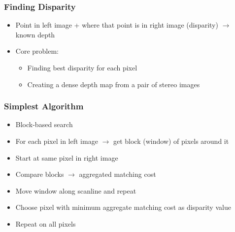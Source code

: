 \documentclass{beamer}
\begin{document}
\begin{frame}
\frametitle{Finding Disparity}
\begin{itemize}
    \item Point in left image + where that point is in right image (disparity) $\rightarrow$ known depth \pause
    \item Core problem:
    \begin{itemize}
        \item Finding best disparity for each pixel \cite{scharstein2002taxonomy}
        \item Creating a dense depth map from a pair of stereo images \cite{scharstein2002taxonomy, zbontar2016stereo}
    \end{itemize}
\end{itemize}
\end{frame}


\begin{frame}
\frametitle{Simplest Algorithm}
\begin{itemize}
    \item Block-based search \cite{scharstein2002taxonomy} \pause
    \item For each pixel in left image $\rightarrow$ get block (window) of pixels around it \pause
    \item Start at same pixel in right image \pause
    \item Compare blocks $\rightarrow$ aggregated matching cost \pause
    \item Move window along scanline and repeat \pause
    \item Choose pixel with minimum aggregate matching cost as disparity value \pause
    \item Repeat on all pixels
\end{itemize}
\end{frame}
\end{document}
